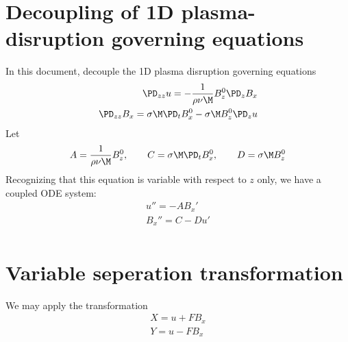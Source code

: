 \documentclass[11pt]{article}
\begin{document}
\doublespacing
\MOONSTITLE
\maketitle

\section{Decoupling of 1D plasma-disruption governing equations}
In this document, decouple the 1D plasma disruption governing equations
\begin{equation}\begin{aligned}
\PD_{zz} u = - \frac{1}{\rho \nu \M} B_z^0 \PD_z B_x \\
\PD_{zz} B_x = \sigma \M \PD_t B_x^0 - \sigma \M B_z^0 \PD_z u \\
\end{aligned} \end{equation}
Let
\begin{equation}\begin{aligned}
A = \frac{1}{\rho \nu \M} B_z^0, \qquad
C = \sigma \M \PD_t B_x^0, \qquad
D = \sigma \M B_z^0
\end{aligned} \end{equation}
Recognizing that this equation is variable with respect to $z$ only, we have a coupled ODE system:
\begin{equation}\begin{aligned}
u''   = - A B_x' \\
B_x'' = C - D u' \\
\end{aligned} \end{equation}

\section{Variable seperation transformation}
We may apply the transformation
\begin{equation}\begin{aligned}
X = u + F B_x \\
Y = u - F B_x \\
\end{aligned} \end{equation}
\end{document}
